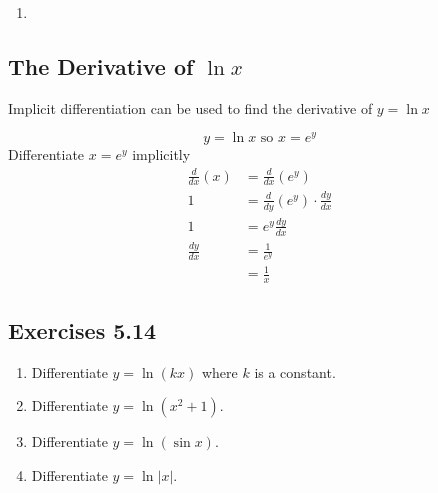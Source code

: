 \begin{enumerate}
\item   
\columnsep =30pt
 \end{enumerate}


\subsection{The Derivative of $\ln  x$}
Implicit differentiation can be used to find the derivative of $y =\ln  x$ 

\begin{equation*}y =\ln  x\text{ so }x =e^{y}
\end{equation*}Differentiate $x =e^{y}$ implicitly
\begin{align*}\frac{d}{d x} \left (x\right ) &  = \frac{d}{d x} \left (e^{y}\right ) \\
1 &  = \frac{d}{d y} (e^{y}) \cdot \frac{d y}{d x} \\
1 &  = e^{y} \frac{d y}{d x} \\
\frac{d y}{d x} &  = \frac{1}{e^{y}} \\
 &  = \frac{1}{x}\end{align*}

\subsection{Exercises 5.14}
\begin{enumerate}
\item Differentiate $y =\ln  (k x)$ where $k$ is a constant. 

\item Differentiate $y =\ln  (x^{2} +1)$. 

\item Differentiate $y =\ln  (\sin  x)$. 

\item Differentiate $y =\ln  \left \vert x\right \vert \text{.}$ \end{enumerate}


